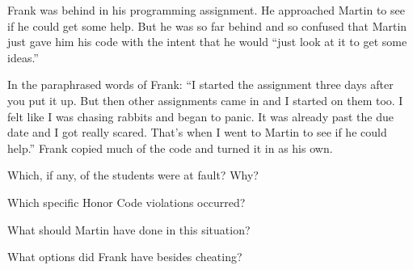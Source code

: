 
Frank was behind in his programming assignment.
He approached Martin to see if he could get some help.
But he was so far behind and so confused that Martin just gave him his code with the intent that he would ``just look at it to get some ideas.''

\vspace{1em}

In the paraphrased words of Frank: ``I started the assignment three days after you put it up.
But then other assignments came in and I started on them too.
I felt like I was chasing rabbits and began to panic.
It was already past the due date and I got really scared.
That's when I went to Martin to see if he could help.''
Frank copied much of the code and turned it in as his own.




\Q Which, if any, of the students were at fault? Why?

\begin{answer}[5em]
\end{answer}


\Q Which specific Honor Code violations occurred?

\begin{answer}[5em]
\end{answer}


\Q What should Martin have done in this situation?

\begin{answer}[5em]
\end{answer}


\Q What options did Frank have besides cheating?

\begin{answer}[5em]
\end{answer}
